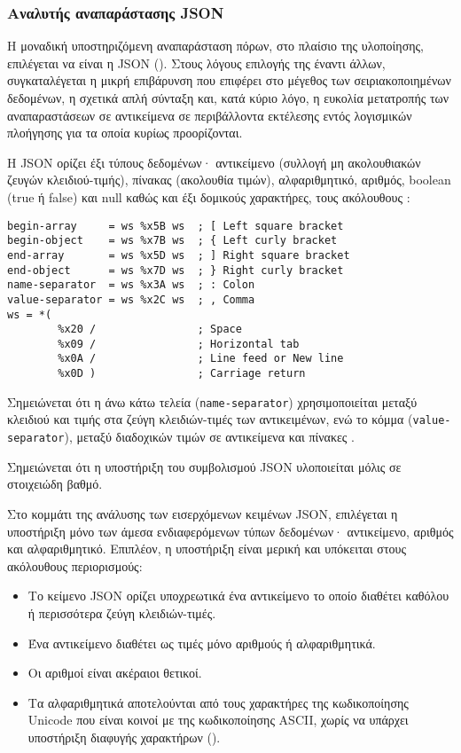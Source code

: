 \subsubsection{Αναλυτής αναπαράστασης JSON}

Η μοναδική υποστηριζόμενη αναπαράσταση πόρων, στο πλαίσιο της υλοποίησης,
επιλέγεται να είναι η JSON (). Στους λόγους
επιλογής της έναντι άλλων, συγκαταλέγεται η μικρή επιβάρυνση που επιφέρει στο
μέγεθος των σειριακοποιημένων δεδομένων, η σχετικά απλή σύνταξη και, κατά κύριο
λόγο, η ευκολία μετατροπής των αναπαραστάσεων σε αντικείμενα σε περιβάλλοντα
εκτέλεσης εντός λογισμικών πλοήγησης για τα οποία κυρίως προορίζονται.

Η JSON ορίζει έξι τύπους δεδομένων· αντικείμενο (συλλογή μη ακολουθιακών ζευγών
κλειδιού-τιμής), πίνακας (ακολουθία τιμών), αλφαριθμητικό, αριθμός, boolean
(true ή false) και null καθώς και έξι δομικούς χαρακτήρες, τους ακόλουθους
\parencite[3--5]{rfc7159}:
\begin{lstlisting}
begin-array     = ws %x5B ws  ; [ Left square bracket
begin-object    = ws %x7B ws  ; { Left curly bracket
end-array       = ws %x5D ws  ; ] Right square bracket
end-object      = ws %x7D ws  ; } Right curly bracket
name-separator  = ws %x3A ws  ; : Colon
value-separator = ws %x2C ws  ; , Comma
ws = *(
        %x20 /                ; Space
        %x09 /                ; Horizontal tab
        %x0A /                ; Line feed or New line
        %x0D )                ; Carriage return
\end{lstlisting}
Σημειώνεται ότι η άνω κάτω τελεία (\verb~name-separator~) χρησιμοποιείται μεταξύ
κλειδιού και τιμής στα ζεύγη κλειδιών-τιμές των αντικειμένων, ενώ το κόμμα
(\verb~value-separator~), μεταξύ διαδοχικών τιμών σε αντικείμενα και πίνακες
\parencite[6]{rfc7159}.


Σημειώνεται ότι η υποστήριξη του συμβολισμού JSON υλοποιείται μόλις σε
στοιχειώδη βαθμό.

Στο κομμάτι της ανάλυσης των εισερχόμενων κειμένων JSON, επιλέγεται η υποστήριξη
μόνο των άμεσα ενδιαφερόμενων τύπων δεδομένων· αντικείμενο, αριθμός και
αλφαριθμητικό. Επιπλέον, η υποστήριξη είναι μερική και υπόκειται στους
ακόλουθους περιορισμούς:
\begin{itemize}
    \item  Το κείμενο JSON ορίζει υποχρεωτικά ένα αντικείμενο το οποίο διαθέτει
    καθόλου ή περισσότερα ζεύγη κλειδιών-τιμές.

    \item Ένα αντικείμενο διαθέτει ως τιμές μόνο αριθμούς ή αλφαριθμητικά.

    \item Οι αριθμοί είναι ακέραιοι θετικοί.

    \item Τα αλφαριθμητικά αποτελούνται από τους χαρακτήρες της κωδικοποίησης
    Unicode που είναι κοινοί με της κωδικοποίησης ASCII, χωρίς να υπάρχει
    υποστήριξη διαφυγής χαρακτήρων ().
\end{itemize}

